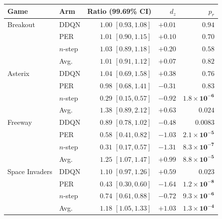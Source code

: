 \begin{tabular}{llrrr}
\toprule
Game & Arm & Ratio (99.69\% CI) & $d_z$ & $p_r$ \\
\midrule
Breakout & DDQN & $1.00$ $[0.93, 1.08]$ & $+0.01$ & $0.94$ \\
 & PER & $1.01$ $[0.90, 1.15]$ & $+0.10$ & $0.70$ \\
 & $n$-step & $1.03$ $[0.89, 1.18]$ & $+0.20$ & $0.58$ \\
 & Avg. & $1.01$ $[0.91, 1.12]$ & $+0.07$ & $0.82$ \\
\midrule
Asterix & DDQN & $1.04$ $[0.69, 1.58]$ & $+0.38$ & $0.76$ \\
 & PER & $0.98$ $[0.68, 1.41]$ & $-0.31$ & $0.83$ \\
 & $n$-step & $0.29$ $[0.15, 0.57]$ & $-0.92$ & $\mathbf{1.8\times10^{-6}}$ \\
 & Avg. & $1.38$ $[0.89, 2.12]$ & $+0.63$ & $0.024$ \\
\midrule
Freeway & DDQN & $0.89$ $[0.78, 1.02]$ & $-0.48$ & $0.0083$ \\
 & PER & $0.58$ $[0.41, 0.82]$ & $-1.03$ & $\mathbf{2.1\times10^{-5}}$ \\
 & $n$-step & $0.31$ $[0.17, 0.57]$ & $-1.31$ & $\mathbf{8.3\times10^{-7}}$ \\
 & Avg. & $1.25$ $[1.07, 1.47]$ & $+0.99$ & $\mathbf{8.8\times10^{-5}}$ \\
\midrule
Space Invaders & DDQN & $1.10$ $[0.97, 1.26]$ & $+0.59$ & $0.023$ \\
 & PER & $0.43$ $[0.30, 0.60]$ & $-1.64$ & $\mathbf{1.2\times10^{-8}}$ \\
 & $n$-step & $0.74$ $[0.61, 0.88]$ & $-0.72$ & $\mathbf{9.3\times10^{-6}}$ \\
 & Avg. & $1.18$ $[1.05, 1.33]$ & $+1.03$ & $\mathbf{1.3\times10^{-4}}$ \\
\bottomrule
\end{tabular}
